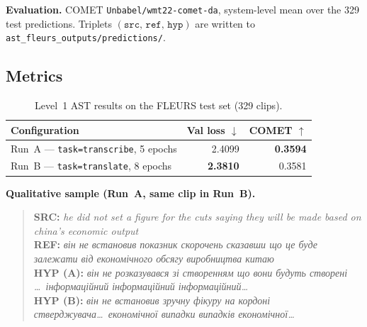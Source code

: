 \documentclass[11pt]{article}
\begin{document}
\noindent\textbf{Evaluation.} COMET \texttt{Unbabel/wmt22-comet-da},
system-level mean over the 329 test predictions. Triplets
$(\texttt{src},\,\texttt{ref},\,\texttt{hyp})$ are written to
\texttt{ast\_fleurs\_outputs/predictions/}.

\subsection{Metrics}
\begin{table}[h]
\centering
\begin{tabular}{lrr}
\toprule
\textbf{Configuration} & \textbf{Val loss $\downarrow$} & \textbf{COMET $\uparrow$} \\
\midrule
Run~A --- \texttt{task=transcribe}, 5 epochs & 2.4099 & \textbf{0.3594} \\
Run~B --- \texttt{task=translate},  8 epochs & \textbf{2.3810} & 0.3581 \\
\bottomrule
\end{tabular}
\caption{Level~1 AST results on the FLEURS test set (329 clips).}
\end{table}

\noindent\textbf{Qualitative sample (Run~A, same clip in Run~B).}
\begin{quote}
\small
\textbf{SRC:} \textit{he did not set a figure for the cuts saying they will be
made based on china's economic output}\\
\textbf{REF:} \textit{він не встановив показник скорочень сказавши що це буде
залежати від економічного обсягу виробництва китаю}\\
\textbf{HYP (A):} \textit{він не розказувався зі створенням що вони будуть
створені \dots~інформаційний інформаційний інформаційний\dots}\\
\textbf{HYP (B):} \textit{він не встановив зручну фікуру на кордоні
стверджувача\dots~економічної випадки випадків економічної\dots}
\end{quote}
\end{document}
